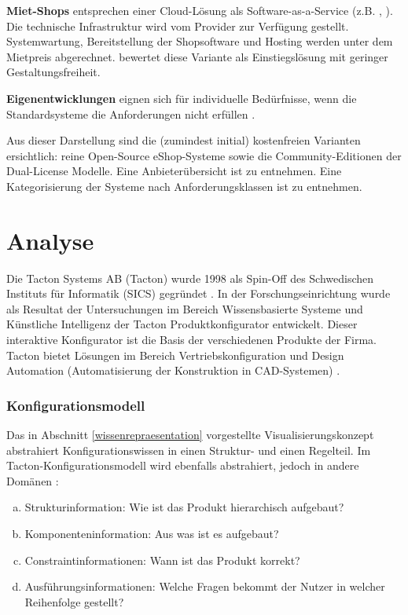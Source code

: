 \documentclass[11pt, a4paper, titlepage, listof=totoc, bibliography=totoc, index=totoc, twoside, openright, headings=normal]{scrreprt}
\begin{document}
\begin{compactitem}
\begin{enumerate}[a.]
\end{enumerate}
\item \textbf{Miet-Shops} entsprechen einer Cloud-Lösung als Software-as-a-Service (z.B. \citeauthor{stratoWebshops}, \citeauthor{shopify15}). Die technische Infrastruktur wird vom Provider zur Verfügung gestellt. Systemwartung, Bereitstellung der Shopsoftware und Hosting werden unter dem Mietpreis abgerechnet. \citet{stahl15} bewertet diese Variante als Einstiegslösung mit geringer Gestaltungsfreiheit.
\item \textbf{Eigenentwicklungen} eignen sich für individuelle Bedürfnisse, wenn die Standardsysteme die Anforderungen nicht erfüllen \citep{stahl15, graf14}.
\end{compactitem}

Aus dieser Darstellung sind die (zumindest initial) kostenfreien Varianten ersichtlich: reine Open-Source eShop-Systeme sowie die Community-Editionen der Dual-License Modelle. Eine Anbieterübersicht ist \citet{t3n14} zu entnehmen. Eine Kategorisierung der Systeme nach Anforderungsklassen ist \citet{graf14} zu entnehmen.

\chapter{Analyse}
\label{section:Analyse}

Die Tacton Systems AB (Tacton) wurde 1998 als Spin-Off des Schwedischen Instituts für Informatik (SICS) gegründet \citep{tactonProductOverview}. In der Forschungseinrichtung wurde als Resultat der Untersuchungen im Bereich Wissensbasierte Systeme und Künstliche Intelligenz der Tacton Produktkonfigurator entwickelt. Dieser interaktive Konfigurator ist die Basis der verschiedenen Produkte der Firma. Tacton bietet Lösungen im Bereich Vertriebskonfiguration und Design Automation (Automatisierung der Konstruktion in CAD-Systemen) \citep{tactonAbout}.

\subsection{Konfigurationsmodell}
\label{subsection:Konfigurationsmodell}
Das in Abschnitt \ref{wissenrepraesentation} vorgestellte Visualisierungskonzept abstrahiert Konfigurationswissen in einen Struktur- und einen Regelteil. Im Tacton-Konfigurationsmodell wird ebenfalls abstrahiert, jedoch in andere Domänen \citep{tactonModeling}:

\begin{enumerate}[(a)]
\item \label{strukturinformation} Strukturinformation: Wie ist das Produkt hierarchisch aufgebaut?
\item \label{komponenteninformation} Komponenteninformation: Aus was ist es aufgebaut?
\item \label{constraintinformationen} Constraintinformationen: Wann ist das Produkt korrekt?
\item \label{ausfuehrungsinformationen} Ausführungsinformationen: Welche Fragen bekommt der Nutzer in welcher Reihenfolge gestellt?
\end{enumerate}
\end{document}
